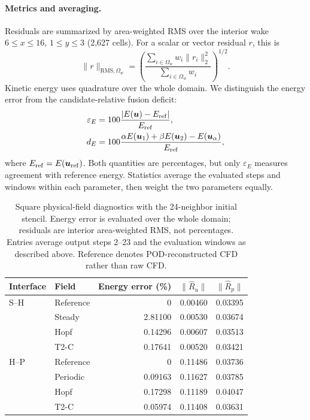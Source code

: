 \paragraph{Metrics and averaging.}
Residuals are summarized by area-weighted RMS over the interior wake
$6\leq x\leq16$, $1\leq y\leq3$ (2,627 cells). For a scalar or vector
residual $r$, this is
\begin{equation}
\|r\|_{\mathrm{RMS},\Omega_w}
=\left(\frac{\sum_{i\in\Omega_w}w_i\|r_i\|_2^2}
{\sum_{i\in\Omega_w}w_i}\right)^{1/2}.
\end{equation}
Kinetic energy uses quadrature over the whole domain. We distinguish
the energy error from the candidate-relative fusion deficit:
\begin{align}
\varepsilon_E&=100\frac{|E(\bm u)-E_{\rm ref}|}{E_{\rm ref}},\\
d_E&=100\frac{\alpha E(\bm u_1)+\beta E(\bm u_2)
-E(\bm u_\alpha)}{E_{\rm ref}},
\end{align}
where $E_{\rm ref}=E(\bm u_{\rm ref})$. Both quantities are percentages,
but only $\varepsilon_E$ measures agreement with reference energy.
Statistics average the evaluated steps and windows within each parameter,
then weight the two parameters equally.

\begin{table}[tbp]
\centering\small
\caption{Square physical-field diagnostics with the 24-neighbor initial
stencil. Energy error is evaluated over the whole domain; residuals are
interior area-weighted RMS, not percentages. Entries average output steps
2--23 and the evaluation windows as described above. Reference denotes
POD-reconstructed CFD rather than raw CFD.}
\label{tab:fusion_residual_measured}
\begin{tabular}{@{}llrrr@{}}
\toprule
Interface & Field & Energy error (\%) & $\|\widehat R_u\|$ & $\|\widehat R_p\|$\\
\midrule
S--H & Reference & 0 & 0.00460 & 0.03395\\
& Steady & 2.81100 & 0.00530 & 0.03674\\
& Hopf & 0.14296 & 0.00607 & 0.03513\\
& T2-C & 0.17641 & 0.00520 & 0.03421\\
\midrule
H--P & Reference & 0 & 0.11486 & 0.03736\\
& Periodic & 0.09163 & 0.11627 & 0.03785\\
& Hopf & 0.17298 & 0.11189 & 0.04047\\
& T2-C & 0.05974 & 0.11408 & 0.03631\\
\bottomrule
\end{tabular}
\end{table}

